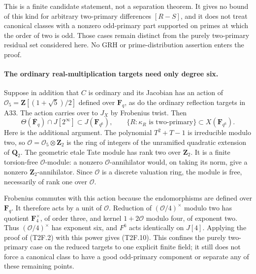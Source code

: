 This is a finite candidate statement, not a separation theorem.
It gives no bound of this kind for arbitrary two-primary
differences $[R-S]$, and it does not treat canonical classes
with a nonzero odd-primary part supported on primes at which
the order of two is odd. Those cases remain distinct from the
purely two-primary residual set considered here. No GRH or
prime-distribution assertion enters the proof.

\paragraph{The ordinary real-multiplication targets need only degree six.}
Suppose in addition that $C$ is ordinary and its Jacobian has an
action of $\mathcal O_5=\mathbf Z[(1+\sqrt5)/2]$ defined over
$\mathbf F_q$, as do the ordinary reflection targets in A33.
The action carries over to $J_X$ by Frobenius twist. Then
\[
 \Theta(\overline{\mathbf F}_q)\cap J[2^\infty]
                     \subset J(\mathbf F_{q^6}),
 \qquad
 \{R:\kappa_R\text{ is two-primary}\}
                     \subset X(\mathbf F_{q^6}).
 \tag{T2F.10}
\]
Here is the additional argument. The polynomial $T^2+T-1$ is
irreducible modulo two, so
$\mathcal O=\mathcal O_5\otimes\mathbf Z_2$ is the ring of
integers of the unramified quadratic extension of $\mathbf Q_2$.
The geometric etale Tate module has rank two over $\mathbf Z_2$.
It is a finite torsion-free $\mathcal O$-module: a nonzero
$\mathcal O$-annihilator would, on taking its norm, give a
nonzero $\mathbf Z_2$-annihilator. Since $\mathcal O$ is a
discrete valuation ring, the module is free, necessarily of
rank one over $\mathcal O$.

Frobenius commutes with this action because the endomorphisms are
defined over $\mathbf F_q$. It therefore acts by a unit of
$\mathcal O$. Reduction of $(\mathcal O/4)^\times$ modulo two
has quotient $\mathbf F_4^\times$, of order three, and kernel
$1+2\mathcal O$ modulo four, of exponent two. Thus
$(\mathcal O/4)^\times$ has exponent six, and $F^6$ acts
identically on $J[4]$. Applying the proof of (T2F.2) with this
power gives (T2F.10). This confines the purely two-primary case
on the reduced targets to one explicit finite field; it still
does not force a canonical class to have a good odd-primary
component or separate any of these remaining points.
